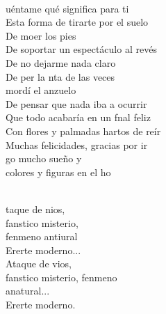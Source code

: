 \begin{cancion}
	\jump\\
	uéntame qué significa para ti\\
Esta forma de tirarte por el suelo\\
	De moer los pies\\
De soportar un espectáculo al revés\\
De no dejarme nada claro\\
	De per la nta de las veces\\
	 mordí el anzuelo\\
De pensar que nada iba a ocurrir\\
	Que todo acabaría en un fnal feliz\\
Con flores y palmadas hartos de reír\\
	Muchas felicidades, gracias por ir\\
	go mucho sueño y\\
	 colores y figuras en el ho \\\jump\\
	\begin{chorus}%
	taque de nios,\\
	fanstico misterio, \\
	fenmeno antiural \\
	Ererte moderno...\\
	Ataque de vios,\\
	fanstico misterio, fenmeno  \\
	anatural...\\
	Ererte moderno.\\
	\end{chorus}%
	\jump\\
\end{cancion}%
